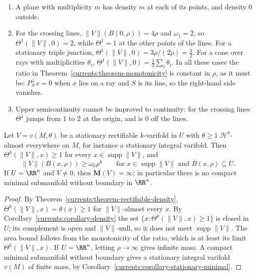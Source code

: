 \begin{example}\label{currents:example-densities}
\begin{enumerate}
\item A plane with multiplicity $m$ has density $m$ at each of its points, and density $0$ outside.
\item For the crossing lines, $\|V\|(B(0, \rho)) = 4\rho$ and $\omega_1 = 2$, so $\Theta^1(\|V\|, 0) = 2$, while $\Theta^1 = 1$ at the other points of the lines. For a stationary triple junction,
$\Theta^1(\|V\|, 0) = 3\rho/(2\rho) = \frac32$. For a cone over rays with multiplicities $\theta_i$, $\Theta^1(\|V\|, 0) = \frac12\sum_i\theta_i$. In all these cases the ratio in
Theorem~\ref{currents:theorem-monotonicity} is constant in $\rho$, as it must be: $P_S^\perp x = 0$ when $x$ lies on a ray and $S$ is its line, so the right-hand side vanishes.
\item Upper semicontinuity cannot be improved to continuity: for the crossing lines $\Theta^1$ jumps from $1$ to $2$ at the origin, and is $0$ off the lines.
\end{enumerate}
\end{example}

\begin{corollary}\label{currents:corollary-lower-bound}
Let $V = v(M, \theta)$ be a stationary rectifiable $k$-varifold in $U$ with $\theta \geq 1$ $\mathcal{H}^k$-almost everywhere on $M$, for instance a stationary integral varifold. Then
$\Theta^k(\|V\|, x) \geq 1$ for every $x \in \operatorname{supp}\|V\|$, and
\[
\|V\|(B(x, \rho)) \geq \omega_k\rho^k \qquad\text{for } x \in \operatorname{supp}\|V\| \text{ and } \overline{B}(x, \rho) \subseteq U .
\]
If $U = \RR^n$ and $V \neq 0$, then $\mathbf{M}(V) = \infty$; in particular there is no compact minimal submanifold without boundary in $\RR^n$.
\end{corollary}

\begin{proof}
By Theorem~\ref{currents:theorem-rectifiable-density}, $\Theta^k(\|V\|, x) = \theta(x) \geq 1$ for $\|V\|$-almost every $x$. By Corollary~\ref{currents:corollary-density} the set
$\{x : \Theta^k(\|V\|, x) \geq 1\}$ is closed in $U$; its complement is open and $\|V\|$-null, so it does not meet $\operatorname{supp}\|V\|$. The area bound follows from the monotonicity of the ratio, which is at
least its limit $\Theta^k(\|V\|, x)$. If $U = \RR^n$, letting $\rho \to \infty$ gives infinite mass. A compact minimal submanifold without boundary gives a stationary integral varifold $v(M)$ of finite mass, by
Corollary~\ref{currents:corollary-stationary-minimal}.
\end{proof}

